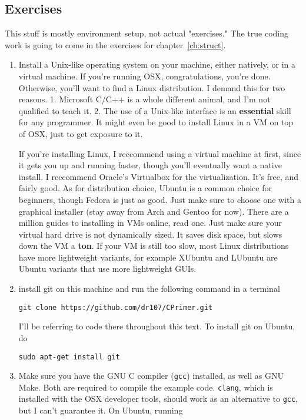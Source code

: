 \documentclass[ebook,11pt,oneside,openany]{memoir}
\begin{document}
\subsection{Exercises}

This stuff is mostly environment setup, not actual "exercises." The true coding work is going to come in the exercises for chapter~\ref{ch:struct}.

\begin{enumerate}
\item Install a Unix-like operating system on your machine, either natively, or in a virtual machine. If you're running OSX, congratulations, you're done. Otherwise, you'll want to find a Linux distribution. I demand this for two reasons. 1. Microsoft C/C++ is a whole different animal, and I'm not qualified to teach it. 2. The use of a Unix-like interface is an \textbf{essential} skill for any programmer. It might even be good to install Linux in a VM on top of OSX, just to get exposure to it.

If you're installing Linux, I reccommend using a virtual machine at first, since it gets you up and running faster, though you'll eventually want a native install. I reccommend Oracle's Virtualbox for the virtualization. It's free, and fairly good. As for distribution choice, Ubuntu is a common choice for beginners, though Fedora is just as good. Just make sure to choose one with a graphical installer (stay away from Arch and Gentoo for now). There are a million guides to installing in VMs online, read one. Just make sure your virtual hard drive is not dynamically sized. It saves disk space, but slows down the VM a \textbf{ton}. If your VM is still too slow, most Linux distributions have more lightweight variants, for example XUbuntu and LUbuntu are Ubuntu variants that use more lightweight GUIs.

\item install git on this machine and run the following command in a terminal
\begin{verbatim}
git clone https://github.com/dr107/CPrimer.git 
\end{verbatim}

I'll be referring to code there throughout this text. To install git on Ubuntu, do

\begin{verbatim}
sudo apt-get install git
\end{verbatim}

\item Make sure you have the GNU C compiler (\texttt{gcc}) installed, as well as GNU Make. Both are required to compile the example code. \texttt{clang}, which is installed with the OSX developer tools, should work as an alternative to \texttt{gcc}, but I can't guarantee it. On Ubuntu, running 


\end{enumerate}
\end{document}
